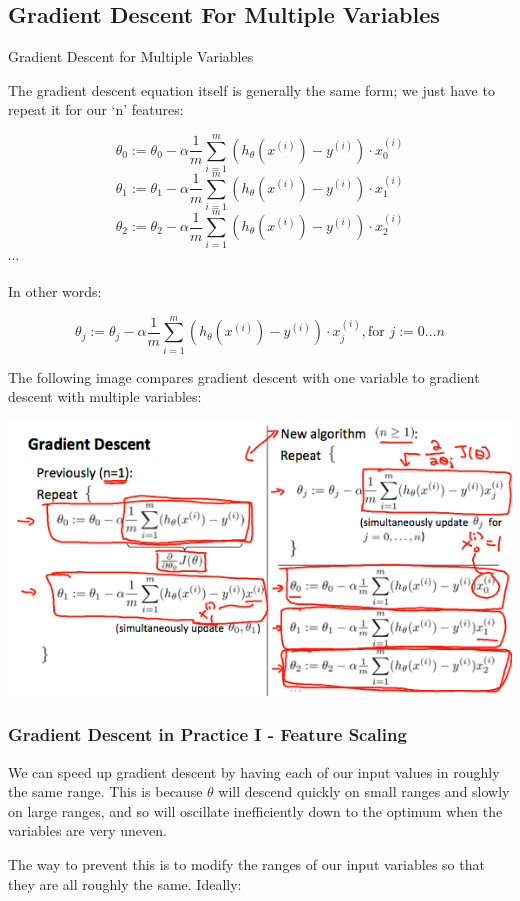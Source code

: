 \documentclass[UTF8]{article}
\begin{document}
\subsection{Gradient Descent For Multiple Variables}

Gradient Descent for Multiple Variables

The gradient descent equation itself is generally the same form; we just have to repeat it for our `n' features:

\[ \theta_0 := \theta_0 - \alpha \frac{1}{m} \sum\limits_{i=1}^{m} (h_\theta(x^{(i)}) - y^{(i)}) \cdot x_0^{(i)} \]
\[ \theta_1 := \theta_1 - \alpha \frac{1}{m} \sum\limits_{i=1}^{m} (h_\theta(x^{(i)}) - y^{(i)}) \cdot x_1^{(i)} \]
\[ \theta_2 := \theta_2 - \alpha \frac{1}{m} \sum\limits_{i=1}^{m} (h_\theta(x^{(i)}) - y^{(i)}) \cdot x_2^{(i)} \]
$\cdots$

In other words:

\[ \theta_j := \theta_j - \alpha \frac{1}{m} \sum\limits_{i=1}^{m} (h_\theta(x^{(i)}) - y^{(i)}) \cdot x_j^{(i)}, \text{for } j := 0...n \]

The following image compares gradient descent with one variable to gradient descent with multiple variables:

\includegraphics[width = .8\textwidth]{NotePics/4_2_1.png}

\subsubsection{Gradient Descent in Practice I - Feature Scaling}

We can speed up gradient descent by having each of our input values in roughly the same range. This is because $\theta$ will descend quickly on small ranges and slowly on large ranges, and so will oscillate inefficiently down to the optimum when the variables are very uneven.

The way to prevent this is to modify the ranges of our input variables so that they are all roughly the same. Ideally:
\end{document}
